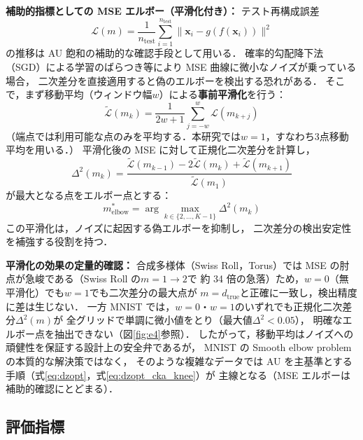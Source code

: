 \documentclass[12pt,a4paper]{jsarticle}
\newcommand{\dz}{m}                         %
\newcommand{\dtrue}{d_{\mathrm{true}}}
\begin{document}
\textbf{補助的指標としての MSE エルボー（平滑化付き）：}
テスト再構成誤差
\begin{equation}
  \mathcal{L}(\dz) = \frac{1}{n_{\mathrm{test}}}
  \sum_{i=1}^{n_{\mathrm{test}}} \|\boldsymbol{x}_i - g(f(\boldsymbol{x}_i))\|^2
  \label{eq:mse_def}
\end{equation}
の推移は AU 飽和の補助的な確認手段として用いる．
確率的勾配降下法（SGD）による学習のばらつき等により
MSE 曲線に微小なノイズが乗っている場合，
二次差分を直接適用すると偽のエルボーを検出する恐れがある．
そこで，まず移動平均（ウィンドウ幅$w$）による\textbf{事前平滑化}を行う：
\begin{equation}
  \tilde{\mathcal{L}}(m_k) = \frac{1}{2w+1}\sum_{j=-w}^{w}\mathcal{L}(m_{k+j})
  \label{eq:mse_smooth}
\end{equation}
（端点では利用可能な点のみを平均する．本研究では$w=1$，すなわち3点移動平均を用いる．）
平滑化後の MSE に対して正規化二次差分を計算し，
\begin{equation}
  \Delta^2(m_k) = \frac{\tilde{\mathcal{L}}(m_{k-1}) - 2\tilde{\mathcal{L}}(m_k) + \tilde{\mathcal{L}}(m_{k+1})}
                        {\tilde{\mathcal{L}}(m_1)}
  \label{eq:elbow}
\end{equation}
が最大となる点をエルボー点とする：
\begin{equation}
  m^*_{\mathrm{elbow}} = \arg\max_{k \in \{2,\ldots,K-1\}} \Delta^2(m_k)
  \label{eq:elbow_def}
\end{equation}
この平滑化は，ノイズに起因する偽エルボーを抑制し，
二次差分の検出安定性を補強する役割を持つ．

\textbf{平滑化の効果の定量的確認：}
合成多様体（Swiss Roll，Torus）では MSE の肘点が急峻である（Swiss Roll の$m=1 \to 2$で
約 34 倍の急落）ため，$w=0$（無平滑化）でも$w=1$でも二次差分の最大点が
$m = \dtrue$と正確に一致し，検出精度に差は生じない．
一方 MNIST では，$w=0$・$w=1$のいずれでも正規化二次差分$\Delta^2(m)$が
全グリッドで単調に微小値をとり（最大値$\Delta^2 < 0.05$），
明確なエルボー点を抽出できない（図\ref{fig:e4}参照）．
したがって，移動平均はノイズへの頑健性を保証する設計上の安全弁であるが，
MNIST の Smooth elbow problem の本質的な解決策ではなく，
そのような複雑なデータでは AU を主基準とする手順（式\eqref{eq:dzopt}，式\eqref{eq:dzopt_cka_knee}）が
主線となる（MSE エルボーは補助的確認にとどまる）．

\subsection{評価指標}
\end{document}
